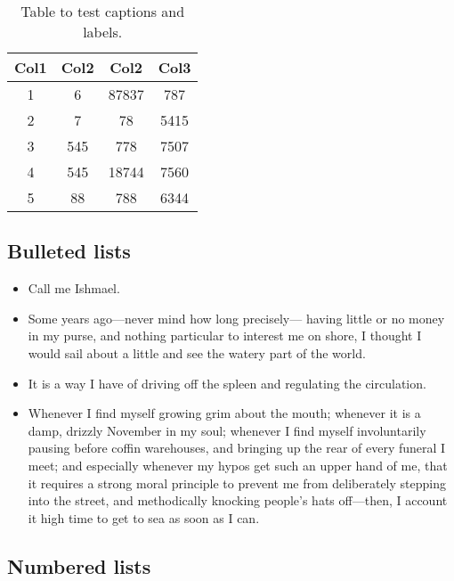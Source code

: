 \documentclass{article}
\begin{document}
\begin{table}
\centering
\begin{tabular}{|c|c|c|c|}
 \hline
 Col1 & Col2 & Col2 & Col3 \\
 \hline
 \hline
 1 & 6 & 87837 & 787 \\
 2 & 7 & 78 & 5415 \\
 3 & 545 & 778 & 7507 \\
 4 & 545 & 18744 & 7560 \\
 5 & 88 & 788 & 6344 \\
 \hline
\end{tabular}
\caption{Table to test captions and labels.}
\label{table:1}
\end{table}

\subsection{Bulleted lists}

\begin{itemize}
  \item Call me Ishmael.
  \item Some years ago---never mind how long precisely---
    having little or no money in my purse, and nothing particular to
    interest me on shore, I thought I would sail about a little and see
    the watery part of the world.
  \item It is a way I have of driving off the
    spleen and regulating the circulation.
  \item Whenever I find myself growing grim about the mouth; whenever it is a damp, drizzly
    November in my soul; whenever I find myself involuntarily pausing
    before coffin warehouses, and bringing up the rear of every funeral
    I meet; and especially whenever my hypos get such an upper hand of me,
    that it requires a strong moral principle to prevent me from
    deliberately stepping into the street, and methodically knocking
    people's hats off---then, I account it high time to get to sea as
    soon as I can.
\end{itemize}

\subsection{Numbered lists}
\end{document}
